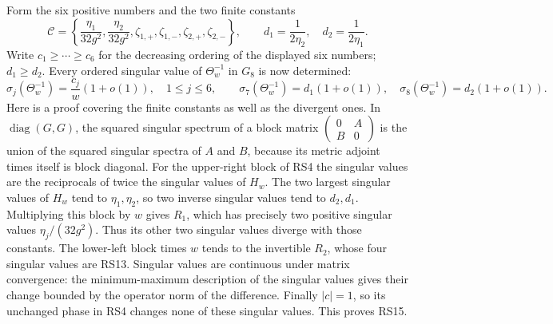 \documentclass[11pt]{article}
\newcommand{\diag}{\operatorname{diag}}
\begin{document}
Form the six positive numbers and the two finite constants
\begin{equation}
 \mathcal C=
 \left\{\frac{\eta_1}{32g^2},\frac{\eta_2}{32g^2},
 \zeta_{1,+},\zeta_{1,-},\zeta_{2,+},\zeta_{2,-}\right\},
 \qquad d_1=\frac1{2\eta_2},\quad d_2=\frac1{2\eta_1}.
 \tag{RS14}
\end{equation}
Write $c_1\ge\cdots\ge c_6$ for the decreasing ordering of
the displayed six numbers; $d_1\ge d_2$. Every ordered singular
value of $\Theta_w^{-1}$ in $G_8$ is now determined:
\begin{equation}
 \sigma_j(\Theta_w^{-1})=\frac{c_j}{w}(1+o(1)),\quad 1\le j\le6,
 \qquad
 \sigma_7(\Theta_w^{-1})=d_1(1+o(1)),\quad
 \sigma_8(\Theta_w^{-1})=d_2(1+o(1)).
 \tag{RS15}
\end{equation}
Here is a proof covering the finite constants as well as the
divergent ones. In $\diag(G,G)$, the squared singular spectrum
of a block matrix $\left(\begin{smallmatrix}0&A\\B&0\end{smallmatrix}\right)$
is the union of the squared singular spectra of $A$ and $B$,
because its metric adjoint times itself is block diagonal.
For the upper-right block of RS4 the singular values are the
reciprocals of twice the singular values of $H_w$. The two
largest singular values of $H_w$ tend to $\eta_1,\eta_2$,
so two inverse singular values tend to $d_2,d_1$.
Multiplying this block by $w$ gives $R_1$, which has precisely
two positive singular values $\eta_j/(32g^2)$. Thus its other
two singular values diverge with those constants. The lower-left
block times $w$ tends to the invertible $R_2$, whose four
singular values are RS13. Singular values are continuous under
matrix convergence: the minimum-maximum description of the
singular values gives their change bounded by the operator norm
of the difference. Finally $|c|=1$, so its unchanged phase in
RS4 changes none of these singular values. This proves RS15.
\end{document}
